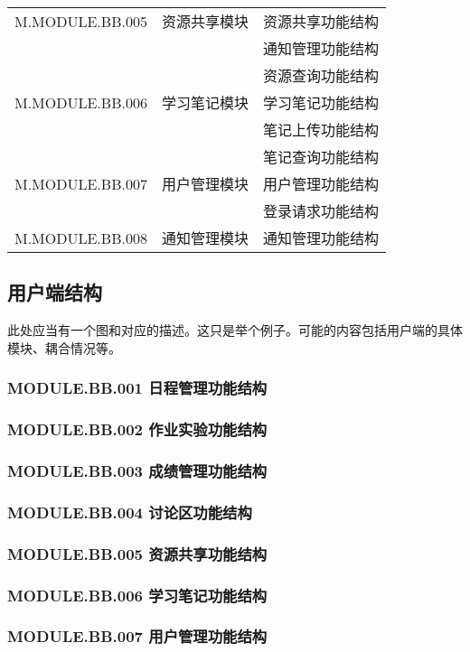 \begin{longtable}{| c | c | p{7cm} |}
M.MODULE.BB.005   &   资源共享模块  &   资源共享功能结构   \\
    &   &   通知管理功能结构    \\
    &   &   资源查询功能结构    \\

M.MODULE.BB.006   &   学习笔记模块   &   学习笔记功能结构   \\
    &   &   笔记上传功能结构    \\
    &   &   笔记查询功能结构    \\

M.MODULE.BB.007   &   用户管理模块   &   用户管理功能结构   \\
    &   &   登录请求功能结构    \\

M.MODULE.BB.008   &   通知管理模块   &   通知管理功能结构   \\

\end{longtable}

\subsection{用户端结构}
此处应当有一个图和对应的描述。这只是举个例子。可能的内容包括用户端的具体模块、耦合情况等。
\subsubsection{MODULE.BB.001    日程管理功能结构}
\subsubsection{MODULE.BB.002    作业实验功能结构}
\subsubsection{MODULE.BB.003    成绩管理功能结构}
\subsubsection{MODULE.BB.004    讨论区功能结构}
\subsubsection{MODULE.BB.005    资源共享功能结构}
\subsubsection{MODULE.BB.006    学习笔记功能结构}
\subsubsection{MODULE.BB.007    用户管理功能结构}
